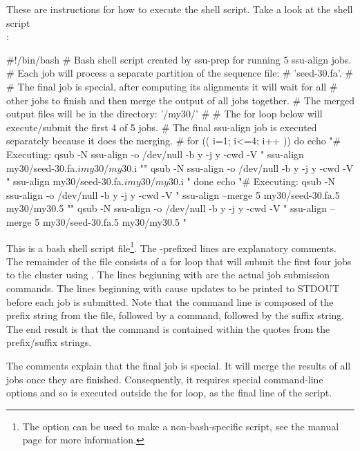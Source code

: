 These are instructions for how to execute the shell script. Take a
look at the shell script \\ :

\begin{sreoutput}
#!/bin/bash
# Bash shell script created by ssu-prep for running 5 ssu-align jobs.
# Each job will process a separate partition of the sequence file:
# 'seed-30.fa'.
#
# The final job is special, after computing its alignments it will wait for all
# other jobs to finish and then merge the output of all jobs together.
# The merged output files will be in the directory: '/my30/'
#
# The for loop below will execute/submit the first 4 of 5 jobs.
# The final ssu-align job is executed separately because it does the merging.
#
for (( i=1; i<=4; i++ ))
do
	echo "# Executing: qsub -N ssu-align -o /dev/null -b y -j y -cwd -V " ssu-align my30/seed-30.fa.$i my30/my30.$i ""
	qsub -N ssu-align -o /dev/null -b y -j y -cwd -V " ssu-align my30/seed-30.fa.$i my30/my30.$i "
done
echo "# Executing: qsub -N ssu-align -o /dev/null -b y -j y -cwd -V " ssu-align --merge 5 my30/seed-30.fa.5 my30/my30.5 ""
qsub -N ssu-align -o /dev/null -b y -j y -cwd -V " ssu-align --merge 5 my30/seed-30.fa.5 my30/my30.5 "
\end{sreoutput}

This is a bash shell script file\footnote{The  option
  can be used to make a non-bash-specific script, see the
   manual page for more information.}.
The \prog{\#}-prefixed lines are
explanatory comments. The remainder of the file consists of a for loop
that will submit the first four  jobs to the cluster
using . The lines beginning with  are the actual
job submission commands. The lines beginning with  cause updates to
be printed to STDOUT before each job is submitted. 
Note that the  command line is composed
of the prefix string from the  file,
followed by a  command, followed by the suffix
string. The end result is that the  command is
contained within the quotes from the prefix/suffix strings.

The comments explain that the final job is special. It will merge the
results of all jobs once they are finished. Consequently, it requires
special command-line options and so is executed outside the for loop,
as the final line of the script.

\begin{comment}
The final important part of the \prog{ssu-prep} output explains what
to do if any of the jobs fail: 

\begin{sreoutput}
# If one or more jobs fail: rerun the failed jobs, wait for them to finish,
# and then perform manual merge from this directory by executing:
#	ssu-merge my30
\end{sreoutput}

This should happen only rarely, but if any jobs fail, this aspect of
the program allows 
\end{comment}

